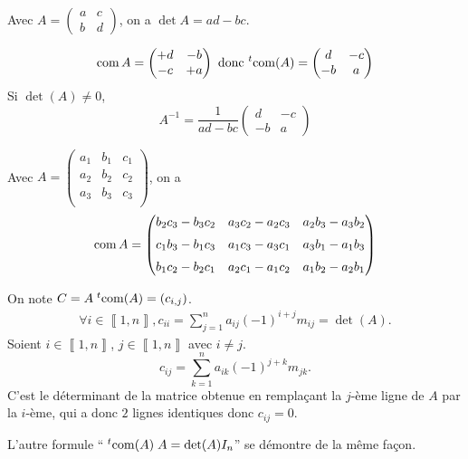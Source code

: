 \begin{exm}
	Avec $A = \begin{pmatrix}
		a&c\\
		b&d
	\end{pmatrix}$, on a $\det A = ad - bc$.

	\[
		\operatorname{com} A = \begin{pmatrix}
			+d&-b\\
			-c&+a
		\end{pmatrix} \text{ donc } {}^t\! \operatorname{com}(A) = \begin{pmatrix}
			d & -c\\
			-b & a
		\end{pmatrix}
	\] Si $\det(A) \neq 0$, \[
		A^{-1} = \frac{1}{ad - bc} \begin{pmatrix}
			d&-c\\
			-b&a
		\end{pmatrix}
	\]
\end{exm}

\begin{exm}
	Avec $A = \begin{pmatrix}
		a_1&b_1&c_1\\
		a_2&b_2&c_2\\
		a_3&b_3&c_3\\
	\end{pmatrix}$, on a \[
		\operatorname{com} A = \begin{pmatrix}
			b_2c_3-b_3c_2 & a_3c_2-a_2c_3 & a_2b_3-a_3b_2\\[2mm]
			c_1b_3-b_1c_3 & a_1c_3-a_3c_1 & a_3b_1-a_1 b_3\\[2mm]
			b_1c_2-b_2c_1 & a_2c_1-a_1c_2 & a_1b_2-a_2b_1
		\end{pmatrix}
	\]
\end{exm}

\begin{prv}
	On note $C = A\; {}^t\!\operatorname{com}(A) = (c_{i,j})$.
	\begin{align*}
		\forall i \in \left\llbracket 1,n \right\rrbracket,
		c_{ii} = \sum_{j=1}^n a_{ij} (-1)^{i+j} m_{ij} = \det(A).
	\end{align*}
	Soient $i \in \left\llbracket 1,n \right\rrbracket$, $j \in \left\llbracket 1,n \right\rrbracket$ avec $i \neq j$. \[
		c_{ij} = \sum_{k=1}^n a_{ik}(-1)^{j+k} m_{jk}.
	\] C'est le déterminant de la matrice obtenue en remplaçant la $j$-ème ligne de $A$ par la $i$-ème, qui a donc $2$ lignes identiques donc $c_{ij} = 0$.

	L'autre formule ``$\;{}^t\!\operatorname{com}(A)\;A = \operatorname{det}(A)I_n$'' se démontre de la même façon.
\end{prv}

